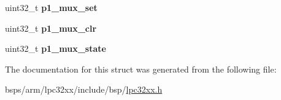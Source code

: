 \begin{DoxyCompactItemize}
\mbox{\label{structlpc32xx__gpio_a986692ba147513d805c56a3d356f8fb9}} 
uint32\+\_\+t {\bfseries p1\+\_\+mux\+\_\+set}
\item 
\mbox{\label{structlpc32xx__gpio_a5033e32727b4ac6b14ab72b49881311d}} 
uint32\+\_\+t {\bfseries p1\+\_\+mux\+\_\+clr}
\item 
\mbox{\label{structlpc32xx__gpio_aa70843e0dec66be64b7550078df26c8f}} 
uint32\+\_\+t {\bfseries p1\+\_\+mux\+\_\+state}
\end{DoxyCompactItemize}


The documentation for this struct was generated from the following file\+:\begin{DoxyCompactItemize}
\item 
bsps/arm/lpc32xx/include/bsp/\mbox{\hyperlink{lpc32xx_8h}{lpc32xx.\+h}}\end{DoxyCompactItemize}
